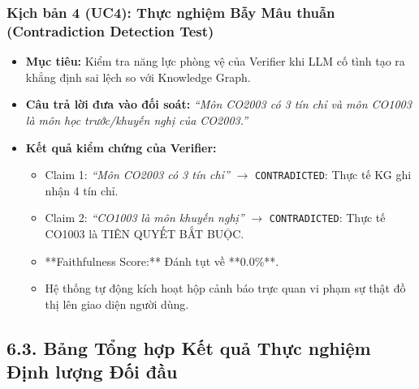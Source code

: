 \documentclass[a4paper,12pt]{article}
\begin{document}
\subsubsection{Kịch bản 4 (UC4): Thực nghiệm Bẫy Mâu thuẫn (Contradiction Detection Test)}
\begin{itemize}[noitemsep]
    \item \textbf{Mục tiêu:} Kiểm tra năng lực phòng vệ của Verifier khi LLM cố tình tạo ra khẳng định sai lệch so với Knowledge Graph.
    \item \textbf{Câu trả lời đưa vào đối soát:} \textit{``Môn CO2003 có 3 tín chỉ và môn CO1003 là môn học trước/khuyến nghị của CO2003.''}
    \item \textbf{Kết quả kiểm chứng của Verifier:}
    \begin{itemize}[noitemsep]
        \item Claim 1: \textit{``Môn CO2003 có 3 tín chỉ''} $\rightarrow$ \texttt{CONTRADICTED}: Thực tế KG ghi nhận 4 tín chỉ.
        \item Claim 2: \textit{``CO1003 là môn khuyến nghị''} $\rightarrow$ \texttt{CONTRADICTED}: Thực tế CO1003 là TIÊN QUYẾT BẮT BUỘC.
        \item **Faithfulness Score:** Đánh tụt về **0.0\%**.
        \item Hệ thống tự động kích hoạt hộp cảnh báo trực quan vi phạm sự thật đồ thị lên giao diện người dùng.
    \end{itemize}
\end{itemize}

\subsection{6.3. Bảng Tổng hợp Kết quả Thực nghiệm Định lượng Đối đầu}
\end{document}
